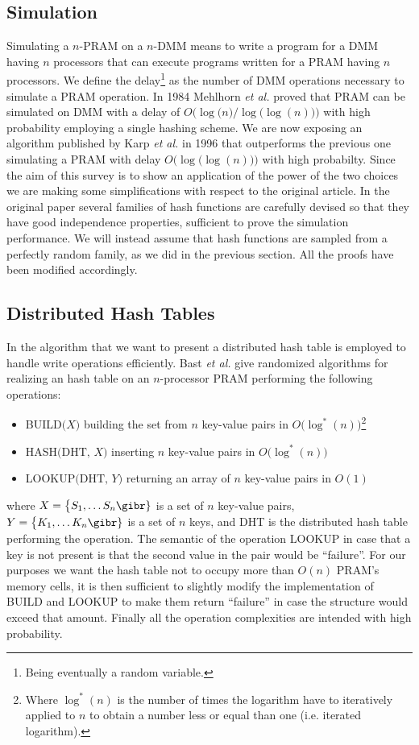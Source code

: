 \subsection{Simulation}
Simulating a $n$-PRAM on a $n$-DMM means to write a program for a DMM having
$n$ processors that can execute programs written for a PRAM having
$n$ processors. We define the delay\footnote{Being eventually
  a random variable.} as the number of DMM operations necessary to simulate
a PRAM operation. In 1984 Mehlhorn {\em et al.} \cite{art} proved that PRAM
can be simulated on DMM with a delay of $O\bigl(\log\bigl(n\bigr)\bigr / \log\bigl(\log(n)\bigr))$
 with high probability employing a single hashing scheme. 
We are now exposing an algorithm published by Karp {\em et al.} \cite{Karp} in
1996 that
outperforms the previous one simulating a PRAM with delay
$O\bigl(\log\bigl(\log(n)\bigr)\bigr)$ with high probabilty.
Since the aim of this survey is to show an application of the power of the two
choices we are making some simplifications with respect to the original article.
In the original paper several families of hash
functions are carefully
devised so that they have good independence properties,
sufficient to prove the simulation 
performance. We will instead assume that hash functions are sampled from
a perfectly random family, as we did in the previous section. All the proofs
have been modified accordingly.

\subsection{Distributed Hash Tables}
In the algorithm that we want to present a distributed hash
table is employed to handle write operations efficiently.
Bast {\em et al.} \cite{Bast}
give randomized algorithms for realizing an hash table on an $n$-processor PRAM
performing the following operations:
\begin{itemize}
\item BUILD$\bigl(X\bigr)$ building the set from $n$ key-value
  pairs in $O\bigl(\log^*(n)\bigr)$\footnote{Where $\log^*(n)$ is the number of
    times the logarithm have to iteratively applied to $n$ to obtain a number
    less or equal than one (i.e. iterated logarithm).}
\item HASH$\bigl(\text{DHT, }X\bigr)$ inserting $n$ key-value pairs in  
  $O\bigl(\log^*(n)\bigr)$
\item LOOKUP$\bigl(\text{DHT, }Y\bigr)$ returning an array of $n$ key-value pairs in $O(1)$
\end{itemize}
where $X = \bigl\{S_1, \dots S_n\gibr\}$ is a set of $n$ key-value pairs,
$Y = \bigl\{K_1, \dots K_n\gibr\}$ is a set of $n$ keys, and DHT is the
distributed hash table performing the operation.
The semantic of the operation LOOKUP in case that a key is not present is that
the second value in the pair would be ``failure''. For our purposes we want
the hash table not to occupy more than $O(n)$ PRAM's memory cells, it is
then sufficient to slightly modify the implementation of BUILD and LOOKUP
to make them return ``failure'' in case the structure would exceed that amount.
Finally all the operation complexities are intended with high probability.


